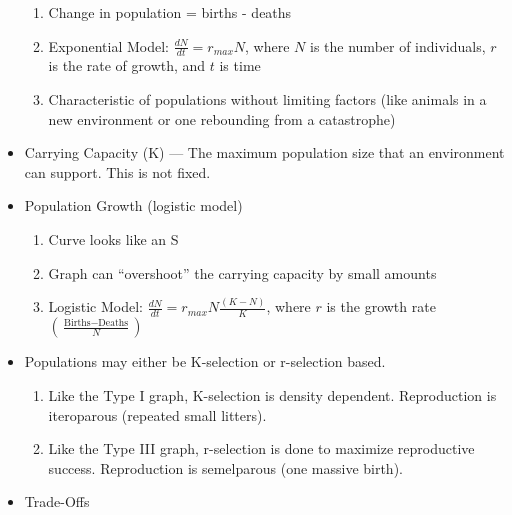 \documentclass[12pt]{article}
\begin{document}
\begin{itemize}
    \begin{enumerate}

      \item Change in population = births - deaths

      \item Exponential Model: $\frac{dN}{dt}=r_{max}N$, where $N$ is the number of individuals, $r$ is the rate of growth, and $t$ is time

      \item Characteristic of populations without limiting factors (like animals in a new environment or one rebounding from a catastrophe)

    \end{enumerate}

  \item Carrying Capacity (K) — The maximum population size that an environment can support. This is not fixed.

  \item Population Growth (logistic model)

    \begin{enumerate}

      \item Curve looks like an S

      \item Graph can “overshoot” the carrying capacity by small amounts

      \item Logistic Model: $\frac{dN}{dt}=r_{max}N\frac{(K-N)}{K}$, where $r$ is the growth rate $\left( \frac{\text{Births}-\text{Deaths}}{N} \right)$

    \end{enumerate}

  \item Populations may either be K-selection or r-selection based.

    \begin{enumerate}

      \item Like the Type I graph, K-selection is density dependent. Reproduction is iteroparous (repeated small litters).

      \item Like the Type III graph, r-selection is done to maximize reproductive success. Reproduction is semelparous (one massive birth).

    \end{enumerate}

  \item Trade-Offs
    

\end{itemize}
\end{document}
